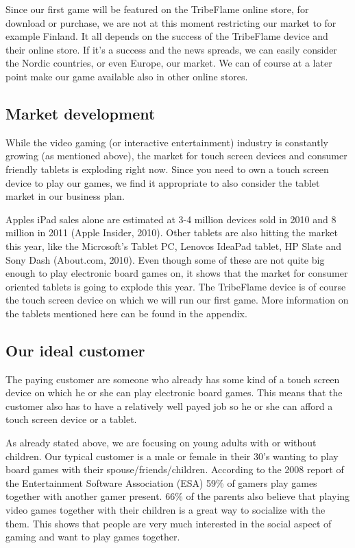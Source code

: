 \documentclass[12pt,a4paper]{article}
\begin{document}
Since our first game will be featured on the TribeFlame online store, for download or purchase, we are not at this moment restricting our market to for example Finland. It all depends on the success of the TribeFlame device and their online store. If it's a success and the news spreads, we can easily consider the Nordic countries, or even Europe, our market. We can of course at a later point make our game available also in other online stores.

\subsection{Market development}
While the video gaming (or interactive entertainment) industry is constantly growing (as mentioned above), the market for touch screen devices and consumer friendly tablets is  exploding right now. Since you need to own a touch screen device to play our games, we find it appropriate to also consider the tablet market in our business plan.

Apples iPad sales alone are estimated at 3-4 million devices sold in 2010 and 8 million in 2011 (Apple Insider, 2010). Other tablets are also hitting the market this year, like the Microsoft's Tablet PC, Lenovos IdeaPad tablet, HP Slate and Sony Dash (About.com, 2010). Even though some of these are not quite big enough to play electronic board games on, it shows that the market for consumer oriented tablets is going to explode this year. The TribeFlame device is of course the touch screen device on which we will run our first game. More information on the tablets mentioned here can be found in the appendix.

\subsection{Our ideal customer}
The paying customer are someone who already has some kind of a touch screen device on which he or she can play electronic board games. This means that the customer also has to have a relatively well payed job so he or she can afford a touch screen device or a tablet.

As already stated above, we are focusing on young adults with or without children. Our typical customer is a male or female in their 30's wanting to play board games with their spouse/friends/children. According to the 2008 report of the Entertainment Software Association (ESA) 59\% of gamers play games together with another gamer present. 66\% of the parents also believe that playing video games together with their children is a great way to socialize with the them. This shows that people are very much interested in the social aspect of gaming and want to play games together.
\end{document}
